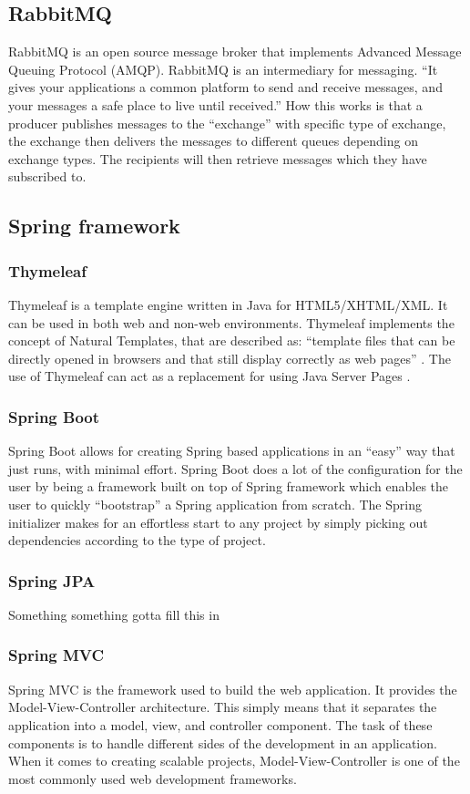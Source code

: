 \subsection{RabbitMQ}
\label{sub:rabbitmq}

RabbitMQ is an open source message broker that implements Advanced Message Queuing Protocol (AMQP). RabbitMQ is an intermediary for messaging. “It gives your applications a common platform to send and receive messages, and your messages a safe place to live until received.” \cite{rabbitftrs}
How this works is that a producer publishes messages to the “exchange” with specific type of exchange, the exchange then delivers the messages to different queues depending on exchange types. The recipients will then retrieve messages which they have subscribed to.

\subsection{Spring framework}
\label{sub:spring}
\subsubsection{Thymeleaf}
Thymeleaf is a template engine written in Java for HTML5/XHTML/XML. It can be used in both web and non-web environments. Thymeleaf implements the concept of Natural Templates, that are described as: “template files that can be directly opened in browsers and that still display correctly as web pages” \cite{thymlf}. The use of Thymeleaf can act as a replacement for using Java Server Pages \cite{javaserverpages}.
\subsubsection{Spring Boot}
Spring Boot allows for creating Spring based applications in an “easy” way that just runs, with minimal effort. Spring Boot does a lot of the configuration for the user by being a framework built on top of Spring framework which enables the user to quickly “bootstrap” a Spring application from scratch. The Spring initializer makes for an effortless start to any project by simply picking out dependencies according to the type of project.
\subsubsection{Spring JPA}
Something something gotta fill this in 
\subsubsection{Spring MVC}
Spring MVC is the framework used to build the web application. It provides the Model-View-Controller architecture. This simply means that it separates the application into a model, view, and controller component. The task of these components is to handle different sides of the development in an application. When it comes to creating scalable projects, Model-View-Controller is one of the most commonly used web development frameworks.
